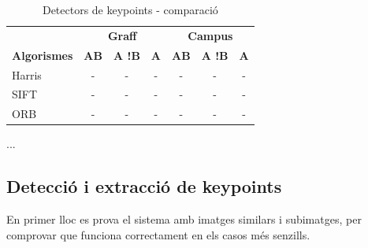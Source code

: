 		\begin{table}[H]
			\begin{center}
				\begin{tabular}{l | c c c | c c c}
					& \multicolumn{3}{c|}{\textbf{Graff}} & \multicolumn{3}{c}{\textbf{Campus}}\\
					\textbf{Algorismes} & \textbf{AB} & \textbf{A !B} & \textbf{A} & \textbf{AB} & \textbf{A !B} & \textbf{A} \\ \hline
					Harris & - & - & - & - & - & - \\
					SIFT & - & - & - & - & - & - \\
					ORB & - & - & - & - & - & - \\
				\end{tabular}
			\end{center}
			\caption{Detectors de keypoints - comparació}
		\end{table}
		\noindent
		...


\newpage
	\subsection{Detecció i extracció de keypoints}
		En primer lloc es prova el sistema amb imatges similars i subimatges, per comprovar  que funciona correctament en els casos més senzills.

